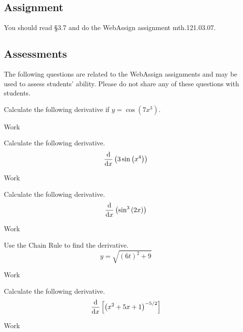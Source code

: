 \documentclass[12pt,addpoints, answers, fleqn]{exam}
\begin{document}
 
 



\subsection{Assignment}
You should read \S  3.7 and do the WebAssign assignment mth.121.03.07.

\vfill
\pagebreak
\begin{teacher}
\subsection{Assessments}
The following questions are related to the WebAssign assignments and may be used to assess students' ability. Please do not share any of these questions with students.
\begin{questions}	
\question 	%

Calculate the following derivative if $y = \cos \left( 7x^3 \right)$.
\begin{solution}
Work
\end{solution}
\question 	%

Calculate the following derivative.
\[
\frac{{\rm{d}}}{{\rm{d}}x} \left( 3 \sin \left(x^4\right) \right)
\]
\begin{solution}
Work
\end{solution}
\question 	%


Calculate the following derivative.
\[
\frac{{\rm{d}}}{{\rm{d}}x} \left(  \sin^3 \left(2x\right) \right)
\]
\begin{solution}
Work
\end{solution}
\question 	%

Use the Chain Rule to find the derivative.
\[
y = \sqrt{\left(6t\right)^2+9}
\]
\begin{solution}
Work
\end{solution}
\question 	%

Calculate the following derivative.
\[
\frac{{\rm{d}}}{{\rm{d}}x} \left[ \left( x^2+5x+1\right)^{-5/2} \right]
\]
\begin{solution}
Work
\end{solution}
\question 	%


\end{questions}
\end{teacher}
\end{document}
